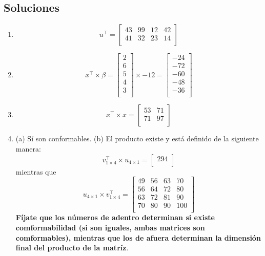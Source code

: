 \documentclass[10pt]{article}
\begin{document}
\begin{enumerate}
\newpage

\section{Soluciones}

\begin{enumerate}
	\item \[u^{\top}=
					\begin{bmatrix}
					43  & 99  & 12 &  42 \\
					41  & 32  & 23 &  14 \\
					\end{bmatrix}
					\]

	\item \[x^{\top}\times\beta=
					\begin{bmatrix}
					2 \\
					6 \\
					5 \\
					4 \\
					3 \\
					\end{bmatrix} \times -12 = \begin{bmatrix}
																-24 \\
																-72 \\
																-60 \\
																-48 \\
																-36 \\
												\end{bmatrix}
					\] 

	\item \[x^{\top}\times x=
					\begin{bmatrix}
					53  &  71\\
					71  & 97 \\
					\end{bmatrix} 
			\] 


	\item (a) S\'i son conformables. (b) El producto existe y est\'a definido de la siguiente manera: \[ v^{\top}_{1\times 4} \times u_{4\times 1} = 
					\begin{bmatrix}
					294\\
					\end{bmatrix} 
			\]mientras que \[ u_{4\times 1} \times v^{\top}_{1\times 4} = \begin{bmatrix}
					49 & 56 & 63 &  70\\
					56 & 64 & 72 &  80\\
					63 & 72 & 81 &  90\\
					70 & 80 & 90 & 100\\
					\end{bmatrix} 
			\] {\bf F\'ijate que los n\'umeros de adentro determinan si existe comformabilidad (si son iguales, ambas matrices son comformables), mientras que los de afuera determinan la dimensi\'on final del producto de la matr\'iz}.




\end{enumerate}
\end{enumerate}
\end{document}
